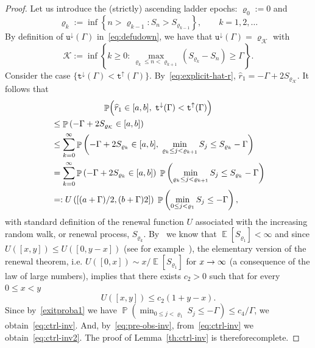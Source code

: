 \documentclass[AHL,Unicode,longabstracts,published]{cedram}
\newcommand{\gG}{\Gamma}
\renewcommand*\ss{\mathtt{u}}
\newcommand{\ttt}{\mathtt{t}}
\newcommand{\ttdown}{\ttt^\downarrow}
\newcommand{\ttup}{\ttt^\uparrow}
\newcommand{\tudown}{\ss^\downarrow}
\DeclareMathOperator{\p}{\mathbb{P}}
\DeclareMathOperator{\e}{\mathbb{E}}
\newcommand{\clK}{\mathcal{K}}
\renewcommand*{\to}{\mathchoice{\longrightarrow}{\rightarrow}{\rightarrow}{\rightarrow}}
\begin{document}
\begin{proof}
Let us introduce the (strictly) ascending ladder epochs: $\varrho_0:=0$ and
\begin{equation}\label{def-rhok}
\varrho_k:= \inf\left\{n> \varrho_{k-1}: S_n > S_{\varrho_{k-1}}\right\}, \qquad k=1, 2, \dots
\end{equation}
By definition of $\tudown(\gG)$ in~\eqref{eq:defudown}, we have that $\tudown(\gG)=\varrho_ {\clK}$ with
\begin{equation}\label{j*}
{\clK} := \inf\left\{k\ge 0: \max_{\varrho_k \le n < \varrho_{k+1}} (S_{\varrho_k}-S_n) \ge \Gamma\right\}.
\end{equation}
Consider the case $\{\ttdown(\Gamma)<\ttup(\Gamma)\}$. By~\eqref{eq:explicit-hat-r}, $\widehat r_1= -\Gamma+ 2 S_{\varrho_{\clK}}$. It follows that
\begin{multline}
\p\Bigl( \widehat r_1\in [a, b], \; \ttdown(\Gamma)<\ttup(\Gamma)\Bigr) \\
\begin{aligned}
&\le
\p\left(-\gG+ 2 S_{\varrho_{\clK}} \in [a, b]\right)\\
&\le
\sum_{k=0}^\infty \p\left(-\Gamma+ 2 S_{\varrho_k} \in [a, b],\; \min_{\varrho_k \le j < \varrho_{k+1}} S_j \le S_{\varrho_k} - \Gamma\right)
\\ &=
\sum_{k=0}^\infty \p\left(-\Gamma+ 2 S_{\varrho_k} \in [a, b]\right)\; \p\left(\min_{ \varrho_{k}\le j < \varrho_{k+1}} S_j \le S_{\varrho_k} - \Gamma\right)
\\
&=: U\left(\left[(a+\Gamma)/2, (b+\Gamma)2\right]\right)\; \p\left(\min_{0\le j < \varrho_1} S_j \le - \Gamma\right),
\end{aligned}
\end{multline}
with standard definition of the renewal function $U$ associated with the increasing random walk, or renewal process, $S_{\varrho_k}$. By~\cite[Chapter~IV, p.~199]{cf:Spitzer} we know that $\e[S_{\varrho_1}]<\infty$ and since $U([x, y]) \le U([0, y-x])$ (see for example~\cite[Theorem~2.4, Chapter V]{cf:Asm}), the elementary version of the {renewal theorem}, i.e. $U([0,x])\sim x/\e[S_{\varrho_1}]$ for $x \to \infty$ (a consequence of the {law of large numbers}), implies that there exists $c_{2}>0$ such that for every $0\le x <y$
\begin{equation}
U([x, y])\le c_{2} (1+ y-x).
\end{equation}
Since by~\eqref{exitproba1} we have $\p(\min_{0\le j < \varrho_1} S_j \le - \Gamma) \le {c_4}/{\Gamma}$, we obtain~\eqref{eq:ctrl-inv}. And, by~\eqref{eq:pre-obs-inv}, from~\eqref{eq:ctrl-inv} we obtain~\eqref{eq:ctrl-inv2}. The proof of Lemma~\ref{th:ctrl-inv} is therefore\linebreak complete.
\end{proof}
\end{document}
